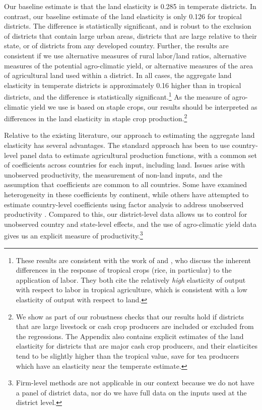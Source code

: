 \documentclass[11pt]{article}
\begin{document}
Our baseline estimate is that the land elasticity is 0.285 in temperate districts. In contrast, our baseline estimate of the land elasticity is only 0.126 for tropical districts. The difference is statistically significant, and is robust to the exclusion of districts that contain large urban areas, districts that are large relative to their state, or of districts from any developed country. Further, the results are consistent if we use alternative measures of rural labor/land ratios, alternative measures of the potential agro-climatic yield, or alternative measures of the area of agricultural land used within a district. In all cases, the aggregate land elasticity in temperate districts is approximately 0.16 higher than in tropical districts, and the difference is statistically significant.\footnote{These results are consistent with the work of \citet{Ruthenberg:1976zr} and \citet{bray1994}, who discuss the inherent differences in the response of tropical crops (rice, in particular) to the application of labor. They both cite the relatively \textit{high} elasticity of output with respect to labor in tropical agriculture, which is consistent with a low elasticity of output with respect to land.} As the measure of agro-climatic yield we use is based on staple crops, our results should be interpreted as differences in the land elasticity in staple crop production.\footnote{We show as part of our robustness checks that our results hold if districts that are large livestock or cash crop producers are included or excluded from the regressions. The Appendix also contains explicit estimates of the land elasticity for districts that are major cash crop producers, and their elasticites tend to be slightly higher than the tropical value, save for tea producers which have an elasticity near the temperate estimate.}

Relative to the existing literature, our approach to estimating the aggregate land elasticity has several advantages. The standard approach has been to use country-level panel data \citep{Hayami:1970ly,Hayami:1985cr,cpr1997,mm2001,Mundlak:2000dq,mbl2012,et2013mango} to estimate agricultural production functions, with a common set of coefficients across countries for each input, including land. Issues arise with unobserved productivity, the measurement of non-land inputs, and the assumption that coefficients are common to all countries. Some have examined heterogeneity in these coefficients \citep{gg2003,Wiebe2003Resource-Qualit} by continent, while others have attempted to estimate country-level coefficients using factor analysis to address unobserved productivity \citep{et2013mango,ev2016clim}. Compared to this, our district-level data allows us to control for unobserved country and state-level effects, and the use of agro-climatic yield data gives us an explicit measure of productivity.\footnote{Firm-level methods \citep{olleypakes1996,levpetrin2003} are not applicable in our context because we do not have a panel of district data, nor do we have full data on the inputs used at the district level.} 
\end{document}
